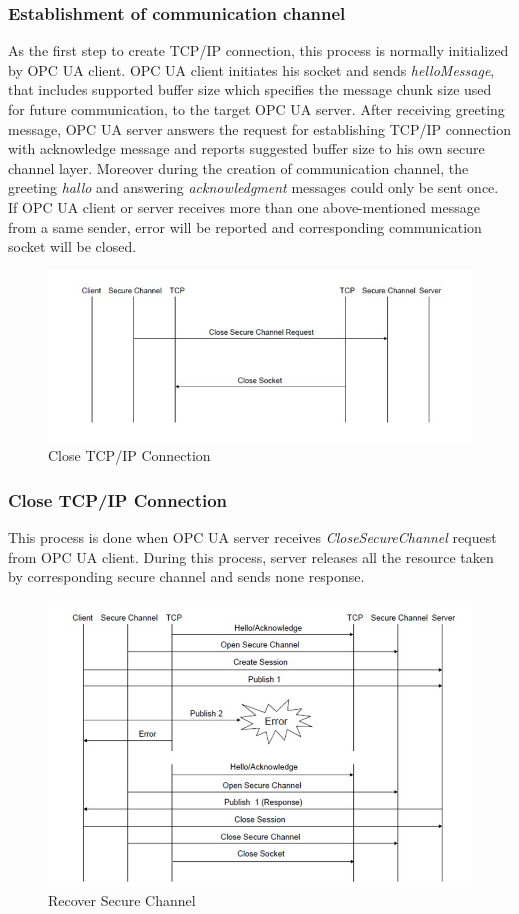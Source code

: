 \documentclass[]{llncs}
\begin{document}
\subsubsection{Establishment of communication channel}
As the first step to create TCP/IP connection, this process is normally initialized by OPC UA client. OPC UA client initiates his socket and sends \emph{helloMessage}, that includes supported buffer size which specifies the message chunk size used for future communication, to the target OPC UA server. After receiving greeting message, OPC UA server answers the request for establishing TCP/IP connection with acknowledge message and reports suggested buffer size to his own secure channel layer. Moreover during the creation of communication channel, the greeting \emph{hallo} and answering \emph{acknowledgment} messages could only be sent once. If OPC UA client or server receives more than one above-mentioned message from a same sender, error will be reported and corresponding communication socket will be closed.
\begin{figure}[!htbp]
	\centering
	\includegraphics[width=1\textwidth]{tcp_2.jpg}
		\caption[ ]{Close TCP/IP Connection\cite{O6}}
	\label{fig:tcp_2}
\end{figure}
\subsubsection{Close TCP/IP Connection}
This process is done when OPC UA server receives \emph{CloseSecureChannel} request from OPC UA client. During this process, server releases all the resource taken by corresponding secure channel and sends none response.
\begin{figure}[!htbp]
	\centering
	\includegraphics[width=1\textwidth]{tcp_3.jpg}
		\caption[ ]{Recover Secure Channel\cite{O6}}
	\label{fig:tcp_3}
\end{figure}
\end{document}
